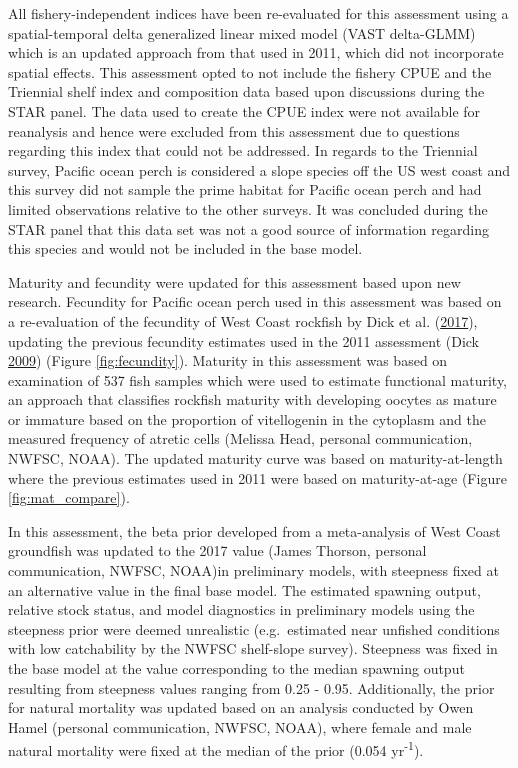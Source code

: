 \documentclass[12pt,]{article}
\begin{document}
All fishery-independent indices have been re-evaluated for this
assessment using a spatial-temporal delta generalized linear mixed model
(VAST delta-GLMM) which is an updated approach from that used in 2011,
which did not incorporate spatial effects. This assessment opted to not
include the fishery CPUE and the Triennial shelf index and composition
data based upon discussions during the STAR panel. The data used to
create the CPUE index were not available for reanalysis and hence were
excluded from this assessment due to questions regarding this index that
could not be addressed. In regards to the Triennial survey, Pacific
ocean perch is considered a slope species off the US west coast and this
survey did not sample the prime habitat for Pacific ocean perch and had
limited observations relative to the other surveys. It was concluded
during the STAR panel that this data set was not a good source of
information regarding this species and would not be included in the base
model.

Maturity and fecundity were updated for this assessment based upon new
research. Fecundity for Pacific ocean perch used in this assessment was
based on a re-evaluation of the fecundity of West Coast rockfish by Dick
et al. (\protect\hyperlink{ref-dick_meta-analysis_2017}{2017}), updating
the previous fecundity estimates used in the 2011 assessment (Dick
\protect\hyperlink{ref-dick_modeling_2009}{2009}) (Figure
\ref{fig:fecundity}). Maturity in this assessment was based on
examination of 537 fish samples which were used to estimate functional
maturity, an approach that classifies rockfish maturity with developing
oocytes as mature or immature based on the proportion of vitellogenin in
the cytoplasm and the measured frequency of atretic cells (Melissa Head,
personal communication, NWFSC, NOAA). The updated maturity curve was
based on maturity-at-length where the previous estimates used in 2011
were based on maturity-at-age (Figure \ref{fig:mat_compare}).

In this assessment, the beta prior developed from a meta-analysis of
West Coast groundfish was updated to the 2017 value (James Thorson,
personal communication, NWFSC, NOAA)in preliminary models, with
steepness fixed at an alternative value in the final base model. The
estimated spawning output, relative stock status, and model diagnostics
in preliminary models using the steepness prior were deemed unrealistic
(e.g.~estimated near unfished conditions with low catchability by the
NWFSC shelf-slope survey). Steepness was fixed in the base model at the
value corresponding to the median spawning output resulting from
steepness values ranging from 0.25 - 0.95. Additionally, the prior for
natural mortality was updated based on an analysis conducted by Owen
Hamel (personal communication, NWFSC, NOAA), where female and male
natural mortality were fixed at the median of the prior (0.054
yr\textsuperscript{-1}).
\end{document}
